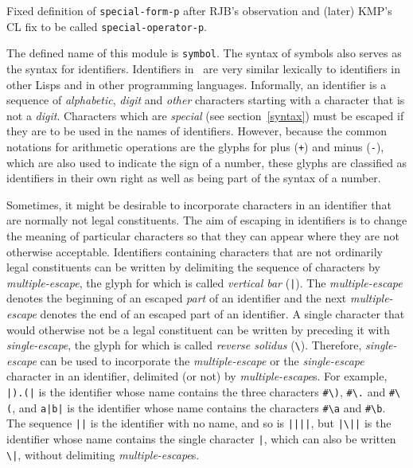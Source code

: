\label{symbol}
%
\begin{optPrivate}
    Fixed definition of {\tt special-form-p} after RJB's observation and (later)
    KMP's CL fix to be called {\tt special-operator-p}.
\end{optPrivate}
%
\begin{optDefinition}
The defined name of this module is {\tt symbol}.
%
%
The syntax of symbols also serves as the syntax for identifiers.
Identifiers in \eulisp\ are very similar lexically
to identifiers in other Lisps and in other programming languages.
Informally, an identifier is a
sequence of {\em alphabetic}, {\em digit\/} and {\em other\/}
characters starting with a character that is not a {\em digit}.
Characters which are {\em special\/} (see section~\ref{syntax}) must
be escaped if they are to be used in the names of identifiers.
However, because the common notations for arithmetic operations are
the glyphs for plus (\verb-+-) and minus (\verb+-+), which are also
used to indicate the sign of a number, these glyphs are classified as
identifiers in their own
right as well as being part of the syntax of a number.

Sometimes, it might be desirable to incorporate characters in an
identifier that are normally not legal constituents.  The aim of
escaping in identifiers is to change the meaning of particular
characters so that they can appear where they are not otherwise
acceptable.  Identifiers containing characters that are not ordinarily
legal constituents can be written by delimiting the sequence of
characters by {\em multiple-escape}, the glyph for which is called
{\em vertical bar\/} (\verb+|+).  The {\em multiple-escape\/} denotes
the beginning of an escaped {\em part\/} of an identifier and the next
{\em multiple-escape\/} denotes the end of an escaped part of an
identifier.  A single character that would otherwise not be a legal
constituent can be written by preceding it with {\em single-escape},
the glyph for which is called {\em reverse solidus\/} (\verb+\+).
Therefore, {\em single-escape\/} can be used to incorporate the {\em
multiple-escape\/} or the {\em single-escape\/} character in an
identifier, delimited (or not) by {\em multiple-escape\/}s.  For
example, \verb+|).(|+ is the identifier whose name contains the three
characters \verb+#\)+, \verb+#\.+ and \verb+#\(+, and \verb+a|b|+ is
the identifier whose name contains the characters \verb+#\a+ and
\verb+#\b+.  The sequence \verb+||+ is the identifier with no name,
and so is \verb+||||+, but \verb+|\||+ is the identifier whose name
contains the single character \verb+|+, which can also be written
\verb+\|+, without delimiting {\em multiple-escape\/}s.


\end{optDefinition}
